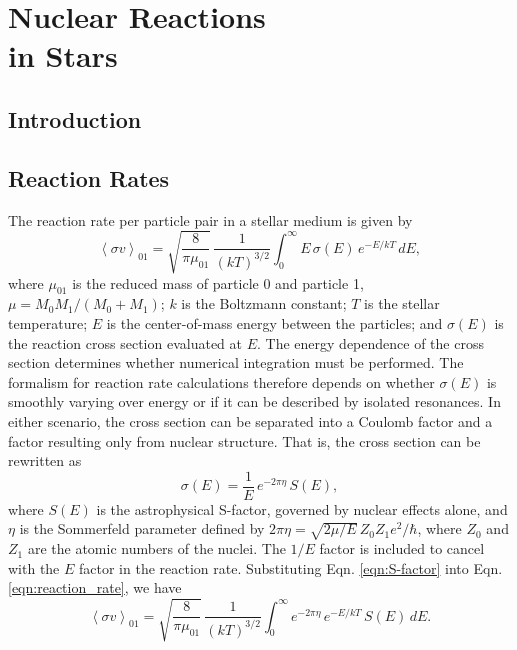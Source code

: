 \chapter[Nuclear Reactions in Stars]{\textbf{Nuclear Reactions \\ in Stars}}
\label{chap:reactions}

\section{Introduction}



\section{Reaction Rates} \label{sec:rates}

The reaction rate per particle pair in a stellar medium is given by
\begin{equation} \label{eqn:reaction_rate}
\left\langle \sigma v \right\rangle_{01} = \sqrt{\frac{8}{\pi \mu_{01}}} \, \frac{1}{(kT)^{3/2}} \int_{0}^{\infty} E \, \sigma(E) \, e^{-E/kT} \, dE,
\end{equation}
where $\mu_{01}$ is the reduced mass of particle 0 and particle 1, $\mu = M_{0}M_{1}/(M_{0}+M_{1})$; $k$ is the Boltzmann constant; $T$ is the stellar temperature; $E$ is the center-of-mass energy between the particles; and $\sigma(E)$ is the reaction cross section evaluated at $E$. The energy dependence of the cross section determines whether numerical integration must be performed. The formalism for reaction rate calculations therefore depends on whether $\sigma(E)$ is smoothly varying over energy or if it can be described by isolated resonances. In either scenario, the cross section can be separated into a Coulomb factor and a factor resulting only from nuclear structure. That is, the cross section can be rewritten as
\begin{equation} \label{eqn:S-factor}
\sigma(E) = \frac{1}{E} \, e^{-2 \pi \eta} \, S(E),
\end{equation}
where $S(E)$ is the astrophysical S-factor, governed by nuclear effects alone, and $\eta$ is the Sommerfeld parameter defined by $2 \pi \eta = \sqrt{2 \mu / E} \,  Z_{0} Z_{1} e^{2} / \hbar$, where $Z_{0}$ and $Z_{1}$ are the atomic numbers of the nuclei. The $1/E$ factor is included to cancel with the $E$ factor in the reaction rate. Substituting Eqn. \ref{eqn:S-factor} into Eqn. \ref{eqn:reaction_rate}, we have
\begin{equation} \label{eqn:reaction_rate_S-factor}
\left\langle \sigma v \right\rangle_{01} = \sqrt{\frac{8}{\pi \mu_{01}}} \, \frac{1}{(kT)^{3/2}} \int_{0}^{\infty} e^{-2 \pi \eta} \, e^{-E/kT} \, S(E) \, dE.
\end{equation}


